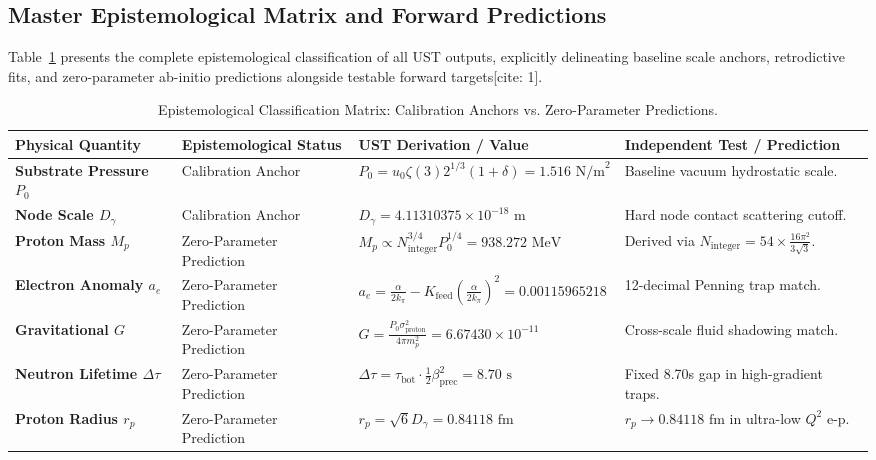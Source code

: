 \documentclass[11pt,a4paper]{article}
\begin{document}
	\subsection{Master Epistemological Matrix and Forward Predictions}
	Table~\ref{tab:epistemology_matrix} presents the complete epistemological classification of all UST outputs, explicitly delineating baseline scale anchors, retrodictive fits, and zero-parameter ab-initio predictions alongside testable forward targets[cite: 1].
	
	\begin{table}[H]
		\centering
		\caption{Epistemological Classification Matrix: Calibration Anchors vs. Zero-Parameter Predictions.}
		\label{tab:epistemology_matrix}
		\begin{tabular}{p{3.2cm}p{3.4cm}p{4.6cm}p{4.6cm}}
			\toprule
			\textbf{Physical Quantity} & \textbf{Epistemological Status} & \textbf{UST Derivation / Value} & \textbf{Independent Test / Prediction} \\
			\midrule
			\textbf{Substrate Pressure $P_0$} & Calibration Anchor & $P_0 = u_0 \zeta(3) 2^{1/3}(1+\delta) = 1.516\text{ N/m}^2$ & Baseline vacuum hydrostatic scale. \\
			\addlinespace
			\textbf{Node Scale $D_\gamma$} & Calibration Anchor & $D_\gamma = 4.11310375 \times 10^{-18}\text{ m}$ & Hard node contact scattering cutoff. \\
			\addlinespace
			\textbf{Proton Mass $M_p$} & Zero-Parameter Prediction & $M_p \propto N_{\text{integer}}^{3/4} P_0^{1/4} = 938.272\text{ MeV}$ & Derived via $N_{\text{integer}} = 54 \times \frac{16\pi^2}{3\sqrt{3}}$. \\
			\addlinespace
			\textbf{Electron Anomaly $a_e$} & Zero-Parameter Prediction & $a_e = \frac{\alpha}{2k_\pi} - K_{\text{feed}} (\frac{\alpha}{2k_\pi})^2 = 0.00115965218$ & 12-decimal Penning trap match. \\
			\addlinespace
			\textbf{Gravitational $G$} & Zero-Parameter Prediction & $G = \frac{P_0 \sigma_{\text{proton}}^2}{4\pi m_p^2} = 6.67430 \times 10^{-11}$ & Cross-scale fluid shadowing match. \\
			\addlinespace
			\textbf{Neutron Lifetime $\Delta\tau$} & Zero-Parameter Prediction & $\Delta\tau = \tau_{\text{bot}} \cdot \frac{1}{2}\beta_{\text{prec}}^2 = 8.70\text{ s}$ & Fixed 8.70s gap in high-gradient traps. \\
			\addlinespace
			\textbf{Proton Radius $r_p$} & Zero-Parameter Prediction & $r_p = \sqrt{6}D_\gamma = 0.84118\text{ fm}$ & $r_p \to 0.84118\text{ fm}$ in ultra-low $Q^2$ e-p. \\

\end{tabular}
\end{table}
\end{document}
